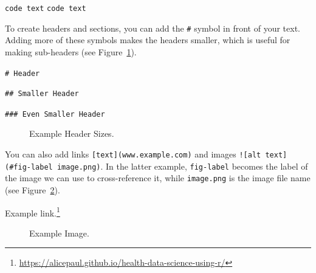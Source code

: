 \documentclass[
  letterpaper,
]{latex/krantz}
\renewcommand{\href}[2]{#2\footnote{\url{#1}}}
\begin{document}
\texttt{\textasciigrave{}code\ text\textasciigrave{}}
\texttt{code\ text}

To create headers and sections, you can add the \texttt{\#} symbol in
front of your text. Adding more of these symbols makes the headers
smaller, which is useful for making sub-headers (see
Figure~\ref{fig-headers}).

\texttt{\#\ Header}

\texttt{\#\#\ Smaller\ Header}

\texttt{\#\#\#\ Even\ Smaller\ Header}

\begin{figure}


\caption{\label{fig-headers}Example Header Sizes.}

\end{figure}%

\newpage

You can also add links \texttt{{[}text{]}(www.example.com)} and images
\texttt{!{[}alt\ text{]}(\#fig-label\ image.png)}. In the latter
example, \texttt{fig-label} becomes the label of the image we can use to
cross-reference it, while \texttt{image.png} is the image file name (see
Figure~\ref{fig-image-ex}).

\href{https://alicepaul.github.io/health-data-science-using-r/}{Example
link.}

\begin{figure}


\caption{\label{fig-image-ex}Example Image.}

\end{figure}%
\end{document}
